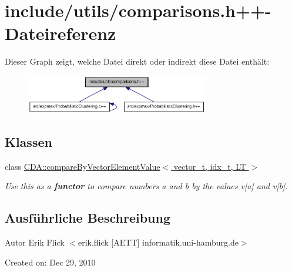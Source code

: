 \hypertarget{comparisons_8h_09_09}{
\section{include/utils/comparisons.h++-\/Dateireferenz}
\label{comparisons_8h_09_09}
}
Dieser Graph zeigt, welche Datei direkt oder indirekt diese Datei enthält:\nopagebreak
\begin{figure}[H]
\begin{center}
\leavevmode
\includegraphics[width=226pt]{comparisons_8h_09_09__dep__incl}
\end{center}
\end{figure}
\subsection*{Klassen}
\begin{DoxyCompactItemize}
\item 
class \hyperlink{structCDA_1_1compareByVectorElementValue}{CDA::compareByVectorElementValue$<$ vector\_\-t, idx\_\-t, LT $>$}
\begin{DoxyCompactList}\small\item\em Use this as a {\bfseries functor} to compare numbers a and b by the values v\mbox{[}a\mbox{]} and v\mbox{[}b\mbox{]}. \item\end{DoxyCompactList}\end{DoxyCompactItemize}


\subsection{Ausführliche Beschreibung}
\begin{DoxyAuthor}{Autor}
Erik Flick $<$erik.flick \mbox{[}AETT\mbox{]} informatik.uni-\/hamburg.de$>$
\end{DoxyAuthor}
Created on: Dec 29, 2010 